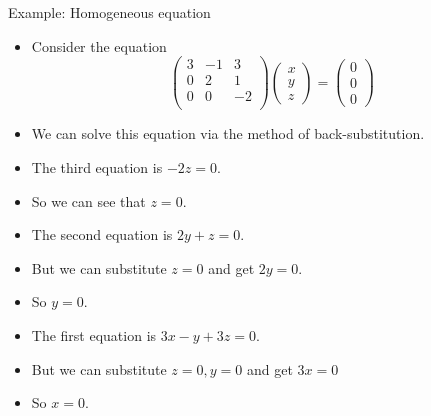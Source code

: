 \documentclass{beamer}
\begin{document}
\begin{frame}{Example: Homogeneous equation}

\begin{itemize}
\item Consider the equation
$$
\begin{pmatrix}
3 & -1  & 3 \\
0 & 2  & 1 \\
0 & 0 & -2 \\
\end{pmatrix}
\begin{pmatrix}
x \\ y \\ z
\end{pmatrix}
=
\begin{pmatrix}
0 \\ 0 \\ 0
\end{pmatrix}
$$
\item We can solve this equation via the method of back-substitution.
\item The third equation is $-2z=0$.
\item So we can see that $z= 0$.
\item The second equation is $2y+z = 0$.
\item But we can substitute $z=0$ and get $2y = 0$.
\item So $y=0$.
\item The first equation is $3x -y +3z = 0$.
\item But we can substitute $z=0, y=0$ and get $3x  = 0$
\item So $x=0$.
\end{itemize}

\end{frame}

\end{document}
